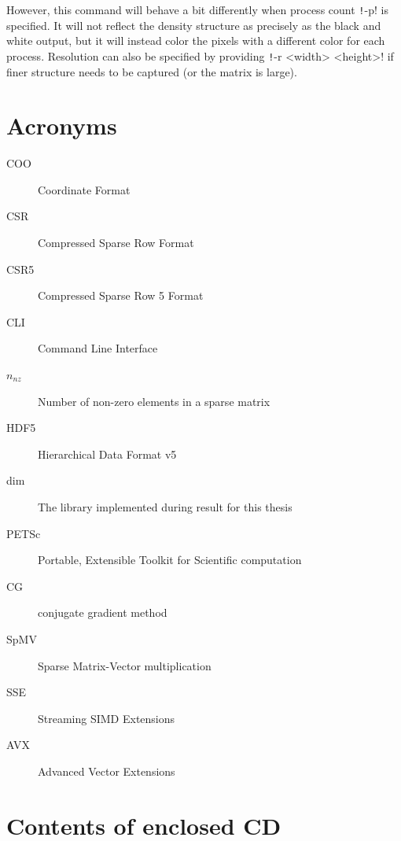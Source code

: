 \documentclass[thesis=M,english]{FITthesis}[2019/12/23]
\newcommand{\csre}[1]{\texttt!#1!}
\begin{document}
However, this command will behave a bit differently when process count \csre{-p} is specified. It will not
reflect the density structure as precisely as the black and white output, but it will instead color the pixels
with a different color for each process. Resolution can also be specified by providing \csre{-r <width> <height>}
if finer structure needs to be captured (or the matrix is large).



\chapter{Acronyms}
\begin{description}
    \item[COO] Coordinate Format
    \item[CSR] Compressed Sparse Row Format
    \item[CSR5] Compressed Sparse Row 5 Format
    \item[CLI] Command Line Interface
    \item[$n_{nz}$] Number of non-zero elements in a sparse matrix
    \item[HDF5] Hierarchical Data Format v5
    \item[dim]  The library implemented during result for this thesis
    \item[PETSc] Portable, Extensible Toolkit for Scientific computation
    \item[CG] conjugate gradient method
    \item[SpMV] Sparse Matrix-Vector multiplication
    \item[SSE] Streaming SIMD Extensions
    \item[AVX] Advanced Vector Extensions
\end{description}


\chapter{Contents of enclosed CD}

\end{document}

